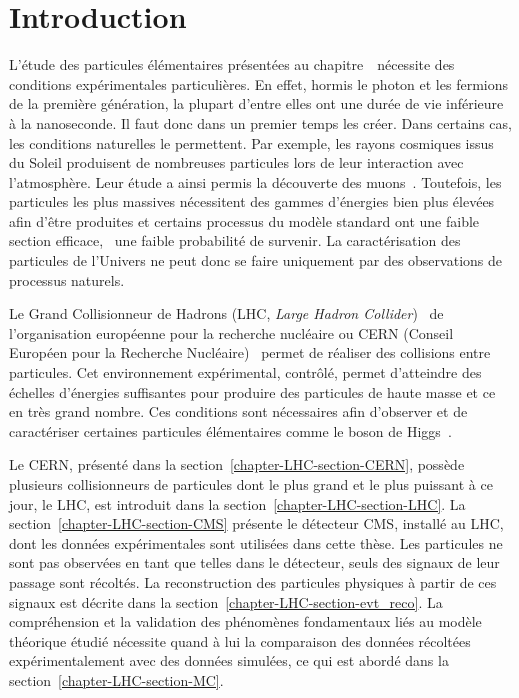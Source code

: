 \section{Introduction}\label{chapter-LHC-section-introduction}
L'étude des particules élémentaires présentées au chapitre~\ nécessite des conditions expérimentales particulières.
En effet,
hormis le photon et les fermions de la première génération,
la plupart d'entre elles ont une durée de vie inférieure à la nanoseconde.
Il faut donc dans un premier temps les créer.
Dans certains cas, les conditions naturelles le permettent.
Par exemple,
les rayons cosmiques issus du Soleil produisent de nombreuses particules lors de leur interaction avec l'atmosphère.
Leur étude a ainsi permis la découverte des muons~\cite{muon_discovery}.
Toutefois,
les particules les plus massives nécessitent des gammes d'énergies bien plus élevées afin d'être produites
et
certains processus du modèle standard ont une faible section efficace, \ie\ une faible probabilité de survenir.
La caractérisation des particules de l'Univers ne peut donc se faire uniquement par des observations de processus naturels.
\par Le Grand Collisionneur de Hadrons (LHC, \emph{Large Hadron Collider})~\cite{LHC_paper1,LHC_paper2,LHC_paper3} de l'organisation européenne pour la recherche nucléaire ou CERN (Conseil Européen pour la Recherche Nucléaire)~\cite{CERN_website} permet de réaliser des collisions entre particules.
Cet environnement expérimental, contrôlé, permet d'atteindre des échelles d'énergies suffisantes pour produire des particules de haute masse et ce en très grand nombre.
Ces conditions sont nécessaires afin d'observer et de caractériser certaines particules élémentaires comme le boson de Higgs~\cite{ATLAS_Higgs_discovery,CMS_Higgs_discovery,CMS_Higgs_discovery_2013,ATLAS-CMS-Higgs_combined_1,ATLAS-CMS-Higgs_combined_2}.
\par Le CERN, présenté dans la section~\ref{chapter-LHC-section-CERN},
possède plusieurs collisionneurs de particules dont
le plus grand et le plus puissant à ce jour, le LHC, est introduit dans la section~\ref{chapter-LHC-section-LHC}.
La section~\ref{chapter-LHC-section-CMS} présente le détecteur CMS, installé au LHC, dont les données expérimentales sont utilisées dans cette thèse.
Les particules ne sont pas observées en tant que telles dans le détecteur,
seuls des signaux de leur passage sont récoltés.
La reconstruction des particules physiques à partir de ces signaux est décrite dans la section~\ref{chapter-LHC-section-evt_reco}.
La compréhension et la validation des phénomènes fondamentaux liés au modèle théorique étudié nécessite quand à lui la comparaison des données récoltées expérimentalement avec des données simulées, ce qui est abordé dans la section~\ref{chapter-LHC-section-MC}.